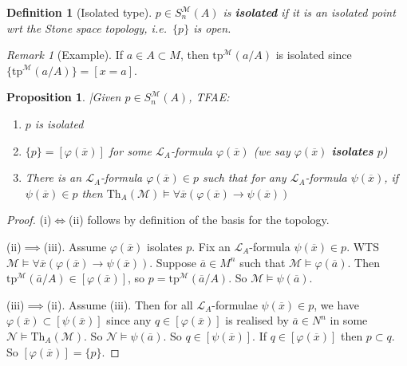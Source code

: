 \documentclass[]{article}
\theoremstyle{custhm}
\theoremstyle{cusdef}
\newtheorem{defin}[theorem]{Definition}
\theoremstyle{custhm}
\theoremstyle{custhm}
\theoremstyle{custhm}
\newtheorem{prop}[theorem]{Proposition}
\theoremstyle{ex}
\theoremstyle{custhm}
\theoremstyle{cusdef}
\theoremstyle{remark}
\newtheorem*{remark*}{Remark}
\theoremstyle{remark}
\newcommand{\ra}{\rightarrow}
\newcommand{\ie}{\textit{i.e.}}
\newcommand{\undf}[1]{\textit{\textbf{#1}}}
\renewcommand{\L}{\mathcal{L}}
\newcommand{\M}{\mathcal{M}}
\renewcommand{\phi}{\varphi}
\renewcommand{\bar}{\overline}
\newcommand{\Th}{\textrm{Th}}
\newcommand{\tp}{\textrm{tp}}
\newcommand{\N}{\mathcal{N}}
\newcommand{\sman}{S_n^\M(A)}
\begin{document}
\begin{defin}[Isolated type]
$p\in \sman$ is \undf{isolated} if it is an isolated point wrt the Stone space topology, \ie\ $\{p\}$ is open.
\end{defin}
\begin{remark*}[Example]
If $a\in A\subset M$, then $\tp^\M(a/A)$ is isolated since $\{\tp^\M(a/A)\} = [x = a]$.
\end{remark*}
\begin{prop}
|Given $p\in \sman$, TFAE:
\begin{enumerate}[label=\roman*)]
	\item $p$ is isolated
	\item $\{p\} = [\phi(\bar{x})]$ for some $\L_A$-formula $\phi(\bar{x})$ (we say $\phi(\bar{x})$ \undf{isolates} $p$)
	\item There is an $\L_A$-formula $\phi(\bar{x})\in p$ such that for any $\L_A$-formula $\psi(\bar{x})$, if $\psi(\bar{x})\in p$ then $\Th_A(\M)\models \forall \bar{x}(\phi(\bar{x})\ra\psi(\bar{x}))$
\end{enumerate}
\end{prop}
\begin{proof}
(i)$\iff$(ii) follows by definition of the basis for the topology.

(ii)$\implies$(iii). Assume $\phi(\bar{x})$ isolates $p$. Fix an $\L_A$-formula $\psi(\bar{x})\in p$. WTS $\M\models \forall \bar{x}(\phi(\bar{x})\ra\psi(\bar{x}))$. Suppose $\bar{a}\in M^n$ such that $\M\models \phi(\bar{a})$. Then $\tp^\M(\bar{a}/A)\in [\phi(\bar{x})]$, so $p = \tp^\M(\bar{a}/A)$. So $\M\models \psi(\bar{a})$.

(iii)$\implies$(ii). Assume (iii). Then for all $\L_A$-formulae $\psi(\bar{x})\in p$, we have $\phi(\bar{x})\subset[\psi(\bar{x})]$ since any $q \in [\phi(\bar{x})]$ is realised by $\bar{a} \in N^n$ in some $\N\models \Th_A(\M)$. So $\N\models \psi(\bar{a})$. So $q \in [\psi(\bar{x})]$. If $q \in [\phi(\bar{x})]$ then $p\subset q$. So $[\phi(\bar{x})] = \{p\}$.
\end{proof}
\end{document}
